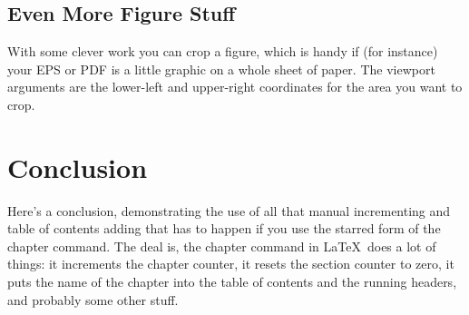 \documentclass[12pt,twoside]{reedthesis}
\begin{document}
\section{Even More Figure Stuff}
With some clever work you can crop a figure, which is handy if (for instance) your EPS or PDF is a little graphic on a whole sheet of paper. The viewport arguments are the lower-left and upper-right coordinates for the area you want to crop.
%
%	

\chapter*{Conclusion}
	\setcounter{chapter}{4}
	\setcounter{section}{0}
	
Here's a conclusion, demonstrating the use of all that manual incrementing and table of contents adding that has to happen if you use the starred form of the chapter command. The deal is, the chapter command in \LaTeX\ does a lot of things: it increments the chapter counter, it resets the section counter to zero, it puts the name of the chapter into the table of contents and the running headers, and probably some other stuff. 
\end{document}
